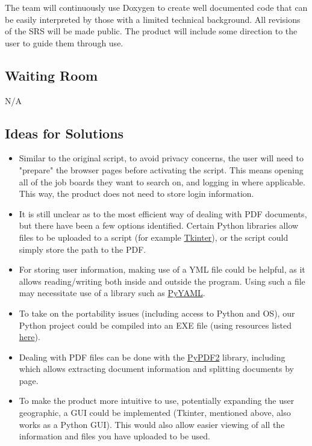 \documentclass[12pt, titlepage]{article}
\begin{document}
The team will continuously use Doxygen to create well documented code that can be easily interpreted by those with a limited technical background. All revisions of the SRS will be made public. The product will include some direction to the user to guide them through use.

\subsection{Waiting Room}

N/A 

\subsection{Ideas for Solutions}

\begin{itemize}
    \item Similar to the original script, to avoid privacy concerns, the user will need to "prepare" the browser pages before activating the script. This means opening all of the job boards they want to search on, and logging in where applicable. This way, the product does not need to store login information.
    \item It is still unclear as to the most efficient way of dealing with PDF documents, but there have been a few options identified. Certain Python libraries allow files to be uploaded to a script (for example \href{https://pythonguides.com/upload-a-file-in-python-tkinter/}{Tkinter}), or the script could simply store the path to the PDF.
    \item For storing user information, making use of a YML file could be helpful, as it allows reading/writing both inside and outside the program. Using such a file may necessitate use of a library such as \href{https://pypi.org/project/PyYAML/}{PyYAML}.
    \item To take on the portability issues (including access to Python and OS), our Python project could be compiled into an EXE file (using resources listed \href{https://stackoverflow.com/questions/12059509/create-a-single-executable-from-a-python-project}{here}).
    \item Dealing with PDF files can be done with the \href{https://pypi.org/project/PyPDF2/}{PyPDF2} library, including which allows extracting document information and splitting documents by page.
    \item To make the product more intuitive to use, potentially expanding the user geographic, a GUI could be implemented (Tkinter, mentioned above, also works as a Python GUI). This would also allow easier viewing of all the information and files you have uploaded to be used.
\end{itemize}
\end{document}
